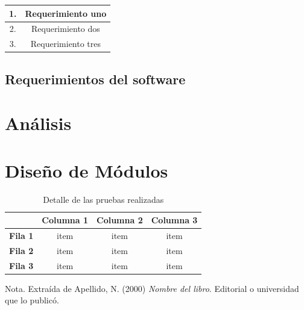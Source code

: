 \begin{center}
    \begin{tabular}{ |c|c| } 
     \hline
     1. & Requerimiento uno\\
     \hline 
     2. & Requerimiento dos \\ 
     \hline
     3. & Requerimiento tres \\ 
     \hline
    \end{tabular}
\end{center}

\subsection{Requerimientos del software}

\section{Análisis}
\section{Diseño de Módulos}

\begin{table}[H]
    \caption{Detalle de las pruebas realizadas}
    \label{tabla:ejemplo}
    \begin{center}
        \begin{tabular}{c|c|c|c|}
            \cline{2-4}
            & \textbf{Columna 1} & \textbf{Columna 2} & \textbf{Columna 3} \\ \hline
            \multicolumn{1}{|c|}{\textbf{Fila 1}} & item               & item               & item               \\ \hline
            \multicolumn{1}{|c|}{\textbf{Fila 2}} & item               & item               & item               \\ \hline
            \multicolumn{1}{|c|}{\textbf{Fila 3}} & item               & item               & item               \\ \hline
        \end{tabular}
    \end{center}
    Nota. Extraída de Apellido, N. (2000) \textit{Nombre del libro}.
    Editorial o universidad que lo publicó.
\end{table}

